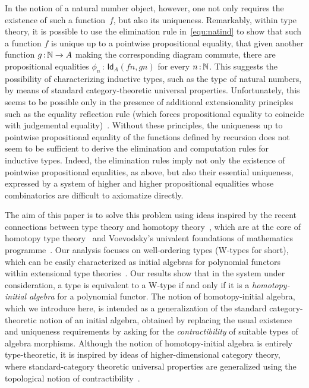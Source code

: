 \documentclass[10pt,a4paper,oneside,reqno]{amsart}
\numberwithin{equation}{section}
\theoremstyle{mythm}
\theoremstyle{mydef}
\theoremstyle{myrmk}
\newcommand{\ie}{\text{i.e.\ }}
\newcommand{\co}{\,{:}\,}
\newcommand{\Id}{\mathsf{Id}}
\begin{document}
In the notion of a natural number object, however, one not only requires the existence of such a function~$f$, 
but also its uniqueness. Remarkably, within type theory, it is possible to use the elimination
rule in~\eqref{equ:natind} to show that such a function $f$ is unique up to a pointwise propositional equality,
\ie that given another function $g \co \Nat \to A$ making the corresponding diagram commute, there are
propositional equalities $\phi_n  \co \Id_A(fn, gn)$ for every $n \co \Nat$. This suggests the possibility of 
 characterizing inductive types, such as the type of natural numbers, by means of standard
category-theoretic universal properties. Unfortunately, this seems to be possible only in the
presence of additional extensionality principles such as the equality reflection rule (which forces 
propositional equality to coincide with judgemental equality)~\cite{DybjerP:repids,GoguenH:inddtw,MoerdijkI:weltc}.  Without these principles, the uniqueness up to pointwise propositional equality of the functions defined by recursion does not seem to
be sufficient to derive the elimination and computation rules for inductive types. Indeed,
the elimination rules imply not only the existence of pointwise propositional equalities,
as above, but also their essential uniqueness, expressed by a system of higher and higher propositional equalities
whose combinatorics are difficult to axiomatize directly. 

The aim of this paper is to solve this problem using ideas inspired by the
recent connections between type theory and homotopy theory~\cite{AwodeyS:homtmi,ssets}, which are at the core of homotopy type theory~\cite{hott} and Voevodsky's univalent foundations of mathematics programme~\cite{VoevodskyV:notts}. 
Our analysis focuses on well-ordering types (W-types for short),
which can be easily characterized as initial algebras for polynomial functors within extensional type
theories~\cite{AbbottM:concsp,DybjerP:repids,GambinoN:weltdp,MoerdijkI:weltc}. Our
results show that in the system under consideration, a type is equivalent to a W-type if and only if
it is a \emph{homotopy-initial algebra} for a polynomial functor. The notion of homotopy-initial
algebra, which we introduce here, is intended as a generalization of the standard category-theoretic
notion of an initial algebra, obtained by replacing the usual existence and uniqueness requirements
by asking for the \emph{contractibility} of suitable types of algebra morphisms. Although the notion 
of homotopy-initial algebra is entirely type-theoretic, it is inspired by ideas of higher-dimensional
category theory, where standard-category theoretic universal properties are generalized using the topological
 notion of contractibility~\cite{LurieJ:higtt}. 
\end{document}
